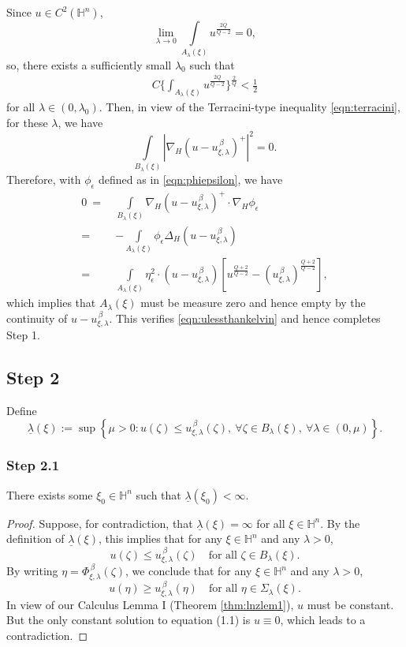 \documentclass[reqno]{amsart}
\theoremstyle{definition}
\theoremstyle{remark}
\numberwithin{equation}{section}
\begin{document}
Since $u\in C^2(\mathbb{H}^n)$,
\[
\lim_{\lambda\to 0} \int\limits_{A_{\lambda}(\xi)} u^{\frac {2Q}{Q-2}} 
=0,
\]
so, there exists a sufficiently small $\lambda_0$ such that
\begin{align*}
C \Bigg\{ \int_{A_{\lambda}(\xi)} u^{\frac {2Q}{Q-2}} \Bigg\}^{\frac {2}{Q}} < \frac {1}{2}
\end{align*}
for all $\lambda\in (0,\lambda_0)$.
Then, in view of the Terracini-type inequality \eqref{eqn:terracini}, for these $\lambda$, we have 
\[
\int\limits_{B_{\lambda}(\xi)} \left|\nabla_{\! H} (u-u_{\xi,\lambda}^{\,\beta})^{+}\right|^2 =0.
\]
Therefore, with $\phi_{\epsilon}$ defined as in \eqref{eqn:phiepsilon}, we have
\begin{align*}
0 ~=~& \int\limits_{B_{\lambda}(\xi)}  \nabla_{\! H} (u-u_{\xi,\lambda}^{\,\beta})^{+} \cdot \nabla_{\! H} \phi_{\epsilon}\\
=~& - \int\limits_{A_{\lambda}(\xi)} \phi_{\epsilon} \Delta_{\! H} (u-u_{\xi,\lambda}^{\,\beta}) \\
=~& \int\limits_{A_{\lambda}(\xi)} \eta_{\epsilon}^2\cdot (u-u_{\xi,\lambda}^{\,\beta}) \left[u^{\frac {Q+2}{Q-2}} -(u_{\xi,\lambda}^{\,\beta})^{\frac {Q+2}{Q-2}}\right],
\end{align*}
which implies that $A_{\lambda}(\xi)$ must be measure zero and hence empty by the continuity of 
$u-u_{\xi,\lambda}^{\,\beta}$. This verifies \eqref{eqn:ulessthankelvin} and hence completes Step 1.

\subsection*{Step 2}

Define
\[
\underline{\lambda}(\xi) := \sup\left\{\mu > 0 : u(\zeta) \leq u_{\xi,\lambda}^{\,\beta}(\zeta),\ \forall\zeta\in B_{\lambda}(\xi),\ \forall \lambda\in (0, \mu)\right\}.
\]

\subsubsection*{Step 2.1}
There exists some $\xi_0 \in \mathbb{H}^n$ such that $\underline{\lambda}(\xi_0) < \infty$.

\begin{proof}
Suppose, for contradiction, that $\underline{\lambda}(\xi) = \infty$ for all $\xi \in \mathbb{H}^n$. By the definition of $\underline{\lambda}(\xi)$, this implies that for any $\xi \in \mathbb{H}^n$ and any $\lambda > 0$,
\[
u(\zeta) \leq u_{\xi,\lambda}^{\,\beta}(\zeta) \quad \text{for all } \zeta \in B_{\lambda}(\xi).
\]
By writing $\eta=\Phi_{\xi,\lambda}^{\, \beta}(\zeta)$, we conclude that for any $\xi \in \mathbb{H}^n$ and any $\lambda > 0$,
\[
u(\eta) \geq u_{\xi,\lambda}^{\,\beta}(\eta) \quad \text{for all } \eta \in \Sigma_{\lambda}(\xi).
\]
In view of our Calculus Lemma I (Theorem \ref{thm:lnzlem1}), $u$ must be constant. But the only constant solution to equation (1.1) is $u \equiv 0$, which leads to a contradiction.
\end{proof}
\end{document}
